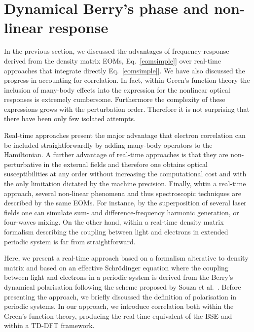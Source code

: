 \section{Dynamical Berry's phase and non-linear response} 
\label{chapterberry}
In the previous section, we discussed the advantages of frequency-response derived from the  density matrix EOMs, Eq.~\ref{eomsimple}] over real-time approaches that integrate directly Eq.~\ref{eomsimple}].
    We have also discussed the progress in accounting for correlation. In fact, within Green's function theory the inclusion of many-body effects into the expression for the nonlinear optical responses is extremely cumbersome. Furthermore the complexity of these expressions grows with the perturbation order. Therefore it is not surprising that there have been only few isolated attempts.

    Real-time approaches present the major advantage that electron correlation can be included straightforwardly by adding many-body operators to the Hamiltonian. A further advantage of real-time approaches is that they are non-perturbative in the external fields and therefore one obtains optical susceptibilities at any order without increasing the computational cost and with the only limitation dictated by the machine precision. Finally, whtin a real-time approach, several non-linear phenomena and thus spectroscopic techniques are described by the same EOMs. For instance, by the superposition of several laser fields one can simulate sum- and difference-frequency harmonic generation, or four-waves mixing.\cite{boyd} On the other hand, within a real-time density matrix formalism describing the coupling between light and electrons in extended  periodic system is far from straightforward.

    Here, we present a real-time \ai approach based on a formalism alterative to density matrix and based on an effective Schr\"odinger equation where the coupling between light and electrons in a periodic system is derived from the Berry's dynamical polarisation following the scheme proposed by Souza et al.~\cite{souza_prb}. Before presenting the approach, we briefly discussed the  definition of polarisation in periodic systems. In our approach, we introduce correlation both within the Green's function theory, producing the real-time equivalent of the BSE and within a TD-DFT framework.  
    
